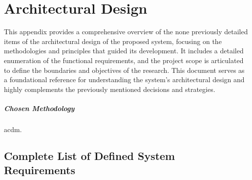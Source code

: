 \chapter{Architectural Design} \label{app:architectural-design}

This appendix provides a comprehensive overview of the none previously detailed items of the architectural design of the proposed system, focusing on the methodologies and principles that guided its development. It includes a detailed enumeration of the functional requirements, and the project scope is articulated to define the boundaries and objectives of the research. This document serves as a foundational reference for understanding the system's architectural design and highly complements the previously mentioned decisions and strategies.

\paragraph{Chosen Methodology} \acl{acdm}.

\section{Complete List of Defined System Requirements} \label{app:ad-system-requirements}


